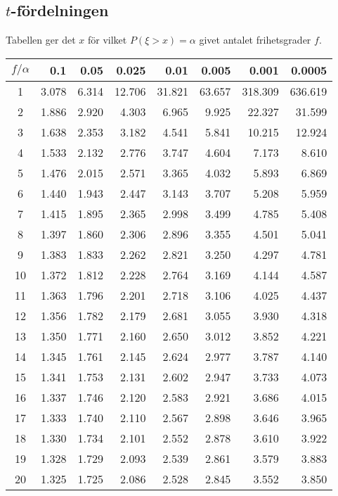 \subsection*{$t$-fördelningen}

Tabellen ger det $x$ för vilket $P(\xi > x)=\alpha$ givet antalet frihetsgrader $f$.

\medskip\def\myskip{\vspace{8pt minus 6pt}}\begin{tabular}{|c|r|r|r|r|r|r|r|}
\hline
$f / \alpha$ &   0.1 &  0.05 & 0.025 &  0.01 & 0.005 & 0.001 & 0.0005 \\\hline
  1&  3.078&  6.314& 12.706& 31.821& 63.657&318.309&636.619\\
  2&  1.886&  2.920&  4.303&  6.965&  9.925& 22.327& 31.599\\
  3&  1.638&  2.353&  3.182&  4.541&  5.841& 10.215& 12.924\\
  4&  1.533&  2.132&  2.776&  3.747&  4.604&  7.173&  8.610\\
  5&  1.476&  2.015&  2.571&  3.365&  4.032&  5.893&  6.869\\
  6&  1.440&  1.943&  2.447&  3.143&  3.707&  5.208&  5.959\\
  7&  1.415&  1.895&  2.365&  2.998&  3.499&  4.785&  5.408\\
  8&  1.397&  1.860&  2.306&  2.896&  3.355&  4.501&  5.041\\
  9&  1.383&  1.833&  2.262&  2.821&  3.250&  4.297&  4.781\\
 10&  1.372&  1.812&  2.228&  2.764&  3.169&  4.144&  4.587\\
 11&  1.363&  1.796&  2.201&  2.718&  3.106&  4.025&  4.437\\
 12&  1.356&  1.782&  2.179&  2.681&  3.055&  3.930&  4.318\\
 13&  1.350&  1.771&  2.160&  2.650&  3.012&  3.852&  4.221\\
 14&  1.345&  1.761&  2.145&  2.624&  2.977&  3.787&  4.140\\
 15&  1.341&  1.753&  2.131&  2.602&  2.947&  3.733&  4.073\\
 16&  1.337&  1.746&  2.120&  2.583&  2.921&  3.686&  4.015\\
 17&  1.333&  1.740&  2.110&  2.567&  2.898&  3.646&  3.965\\
 18&  1.330&  1.734&  2.101&  2.552&  2.878&  3.610&  3.922\\
 19&  1.328&  1.729&  2.093&  2.539&  2.861&  3.579&  3.883\\
 20&  1.325&  1.725&  2.086&  2.528&  2.845&  3.552&  3.850\\

\end{tabular}
